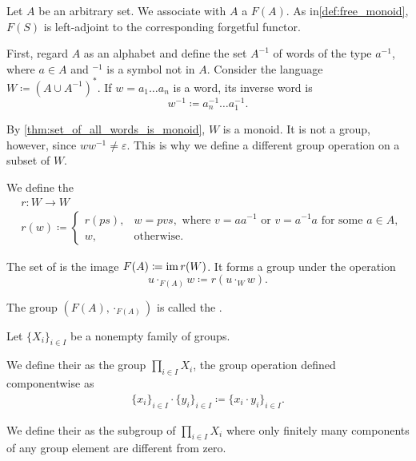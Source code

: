 \begin{definition}\label{def:free_group}\cite[306]{Knapp2016BAlg}
  Let \( A \) be an arbitrary set. We associate with \( A \) a  \( F(A) \). As in\cref{def:free_monoid}, \( F(S) \) is left-adjoint to the corresponding forgetful functor.

  First, regard \( A \) as an alphabet and define the set \( A^{-1} \) of words of the type \( a^{-1} \), where \( a \in A \) and \( \mbox{}^{-1} \) is a symbol not in \( A \). Consider the language \( W \coloneqq (A \cup A^{-1})^{*} \). If \( w = a_1 \ldots a_n \) is a word, its inverse word is
  \begin{equation*}
    w^{-1} \coloneqq a_n^{-1} \ldots a_1^{-1}.
  \end{equation*}

  By \cref{thm:set_of_all_words_is_monoid}, \( W \) is a monoid. It is not a group, however, since \( w w^{-1} \neq \varepsilon \). This is why we define a different group operation on a subset of \( W \).

  We define the 
  \begin{align*}
    &r: W \to W \\
    &r(w) \coloneqq \begin{cases}
      r(ps), &w = pvs, \text{ where } v = aa^{-1} \text{ or } v = a^{-1}a \text{ for some } a \in A, \\
      w, &\text{otherwise}.
    \end{cases}
  \end{align*}

  The set of  is the image \( F(A) \coloneqq \operatorname{im} r(W) \). It forms a group under the operation
  \begin{equation*}
    u \cdot_{F(A)} w \coloneqq r(u \cdot_{W} w).
  \end{equation*}

  The group \( (F(A), \cdot_{F(A)}) \) is called the .
\end{definition}

\begin{definition}\label{def:group_direct_product}
  Let \( \{ X_i \}_{i \in I} \) be a nonempty family of groups.

  We define their  as the group \( \prod_{i \in I} X_i \), the group operation defined componentwise as
  \begin{align*}
    \{ x_i \}_{i \in I} \cdot \{ y_i \}_{i \in I}
    \coloneqq
    \{ x_i \cdot y_i \}_{i \in I}.
  \end{align*}

  We define their  as the subgroup of \( \prod_{i \in I} X_i \) where only finitely many components of any group element are different from zero.
\end{definition}


